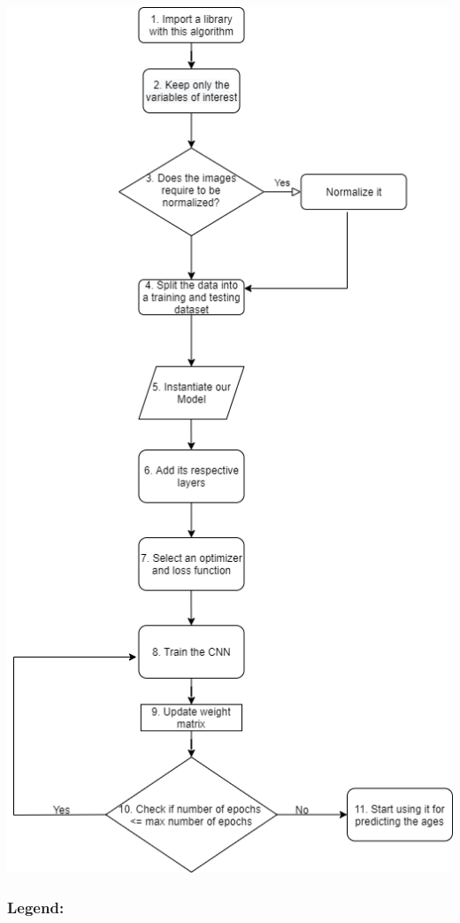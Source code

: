 \documentclass[11pt]{article}
\begin{document}
    \includegraphics{img/CNN_algorithm_flowchart.png}

    \hypertarget{legend}{%
\subsubsection*{Legend:}\label{legend}}
\end{document}
